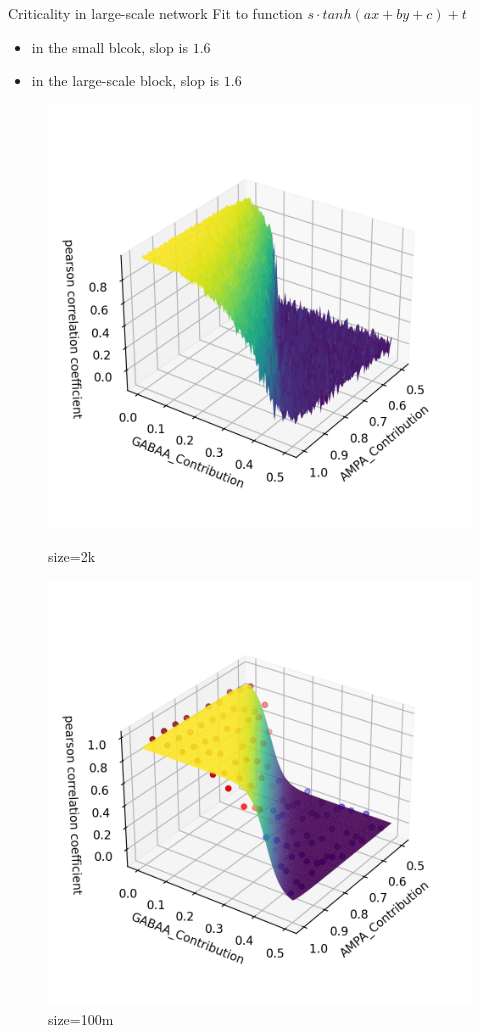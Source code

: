 \documentclass{beamer}
\begin{document}
\begin{frame}{Criticality in large-scale network}
	Fit to function $ s\cdot tanh(ax+by+c) + t $
	\begin{itemize}
		\item in the small blcok, slop is $1.6$
		\item in the large-scale block, slop is $1.6$
	\end{itemize}
\begin{figure}[htbp]
	\centering
	\begin{minipage}{0.49\linewidth}
		\centering
		\includegraphics[width=0.85\linewidth]{fig/small_block_dense_grid_pcc}
		\caption{size=2k}
		\label{small_block}
	\end{minipage}
	\begin{minipage}{0.49\linewidth}
		\centering
		\includegraphics[width=0.85\linewidth]{fig/100m_block_sparse_point_pcc}
		\caption{size=100m}
		\label{big_block}
	\end{minipage}
\end{figure}
\end{frame}
\end{document}

